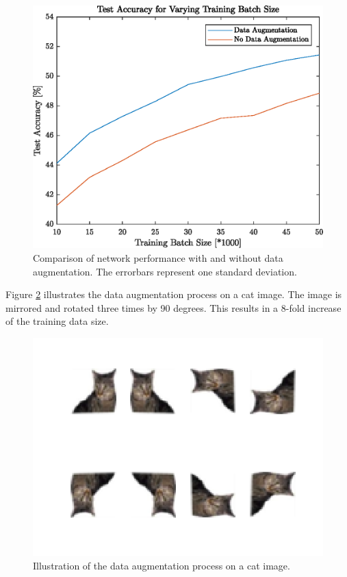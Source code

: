    	\begin{figure}[h!]
		\centering
   	  	\includegraphics{images/dataAugmentation}
   	  	\caption{Comparison of network performance with and without data augmentation. The errorbars represent one standard deviation.}
   	  	\label{fig:dataAugmentation}
   	\end{figure}

Figure \ref{fig:dataAugDemo} illustrates the data augmentation process on a cat image. The image is mirrored and rotated three times by 90 degrees. This results in a 8-fold increase of the training data size.

   	\begin{figure}[h!]
   		\centering
   		\includegraphics{images/DataAugDemo.png}
   		\caption{Illustration of the data augmentation process on a cat image.}
   		\label{fig:dataAugDemo}
   	\end{figure}


